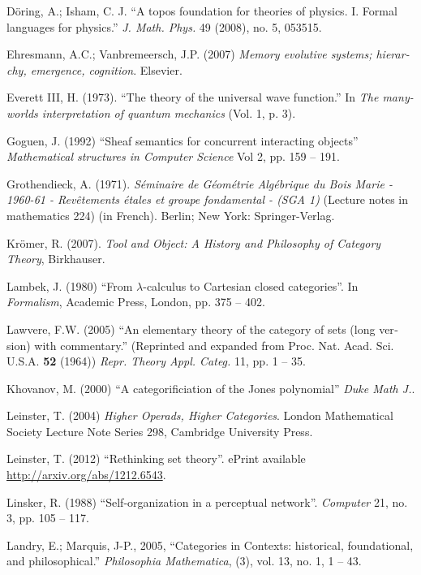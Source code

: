 \documentclass[a4paper]{book}
\theoremstyle{myth}
\begin{document}
\begin{english}
\begin{thebibliography}{SGWB}
 D\"{o}ring, A.; Isham, C. J. “A topos foundation for theories of physics. I. Formal languages for physics.” 
{\em J. Math. Phys.} 49 (2008), no. 5, 053515.

 Ehresmann, A.C.; Vanbremeersch, J.P. (2007) {\em Memory evolutive systems; hierarchy, emergence, cognition}. Elsevier.

 Everett III, H. (1973). “The theory of the universal wave function.” In {\em The many-worlds interpretation of quantum mechanics} (Vol. 1, p. 3).

 Goguen, J. (1992) “Sheaf semantics for concurrent interacting objects” {\em Mathematical structures in Computer Science} Vol 2, pp. 159 -- 191.

 Grothendieck, A. (1971). {\em S\'eminaire de G\'eom\'etrie Alg\'ebrique du Bois Marie - 1960-61 - Rev\^etements \'etales et groupe fondamental - (SGA 1)} (Lecture notes in mathematics 224) (in French). Berlin; New York: Springer-Verlag.

 Kr\"{o}mer, R. (2007). {\em Tool and Object: A History and Philosophy of Category Theory}, Birkhauser.

 Lambek, J. (1980) “From $\lambda$-calculus to Cartesian closed categories”. In {\em Formalism}, Academic Press, London, pp. 375 -- 402.

 Lawvere, F.W. (2005) “An elementary theory of the category of sets (long version) with
   commentary.” (Reprinted and expanded from Proc. Nat. Acad. Sci. U.S.A. {\bf 52}
   (1964)) {\em Repr. Theory Appl. Categ.} 11, pp. 1 -- 35.
   
 Khovanov, M. (2000) “A categorificiation of the Jones polynomial” {\em Duke Math J.}.

 Leinster, T. (2004) {\em Higher Operads, Higher Categories}. London Mathematical Society Lecture Note Series 298, Cambridge University Press.

 Leinster, T. (2012) “Rethinking set theory”. ePrint available \url{http://arxiv.org/abs/1212.6543}.

 Linsker, R. (1988) “Self-organization in a perceptual network”. {\em Computer} 21, no. 3, pp. 105 -- 117.

 Landry, E.; Marquis, J-P., 2005, “Categories in Contexts: historical, foundational, and philosophical.” {\em Philosophia Mathematica}, (3), vol. 13, no. 1, 1 -- 43.


\end{thebibliography}
\end{english}
\end{document}
